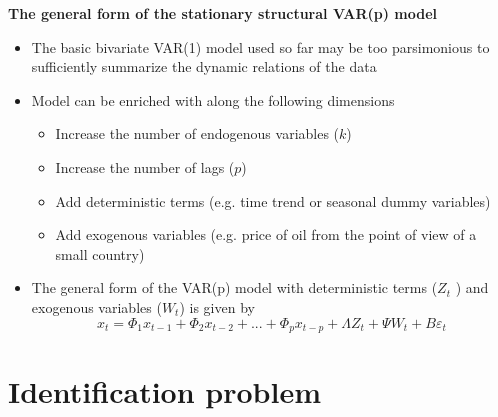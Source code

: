 \documentclass[10pt,english,t,aspectratio=169,ignorenonframetext]{beamer}
\begin{document}
\begin{frame}
{\textbf{The general form of the stationary structural VAR(p) model}}\smallskip

\begin{itemize}
\item The basic bivariate VAR(1) model used so far may be too parsimonious
to sufficiently summarize the dynamic relations of the data\bigskip \pause

\item Model can be enriched with along the following dimensions\smallskip

\begin{itemize}
\item Increase the number of endogenous variables ($k$)\medskip

\item Increase the number of lags ($p$)\medskip

\item Add deterministic terms (e.g. time trend or seasonal dummy
variables)\medskip

\item Add exogenous variables (e.g. price of oil from the point of view of a
small country)\bigskip \medskip \pause
\end{itemize}

\item The general form of the VAR(p) model with deterministic terms ($Z_{t}$%
) and exogenous variables ($W_{t}$) is given by\medskip 
\begin{equation*}
x_{t}=\Phi _{1}x_{t-1}+\Phi _{2}x_{t-2}+...+\Phi _{p}x_{t-p}+\Lambda
Z_{t}+\Psi W_{t}+B\varepsilon _{t}
\end{equation*}
\end{itemize}
\end{frame}


\section{Identification problem}

\begin{frame}
\vspace{3cm}\color{title} 
\end{frame}

\vspace{.1cm}
\end{document}

